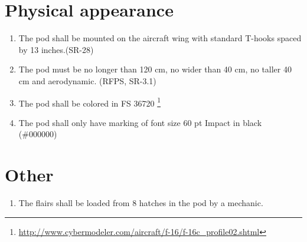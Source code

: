 \documentclass[Main]{subfiles}
\begin{document}
\section{Physical appearance}
\begin{enumerate}[resume*]

\item The pod shall be mounted on the aircraft wing with standard T-hooks spaced by 13 inches.(SR-28)

\item The pod must be no longer than 120 cm, no wider than 40 cm, no taller 40 cm and aerodynamic. (RFPS, SR-3.1)

\item The pod shall be colored in FS 36720 \footnote{\url{http://www.cybermodeler.com/aircraft/f-16/f-16c_profile02.shtml}}

\item The pod shall only have marking of font size 60 pt Impact in black (\#000000)

\end{enumerate}


\section{Other}

\begin{enumerate}[resume*]

\item The flairs shall be loaded from 8 hatches in the pod by a mechanic.

\end{enumerate}
\end{document}
